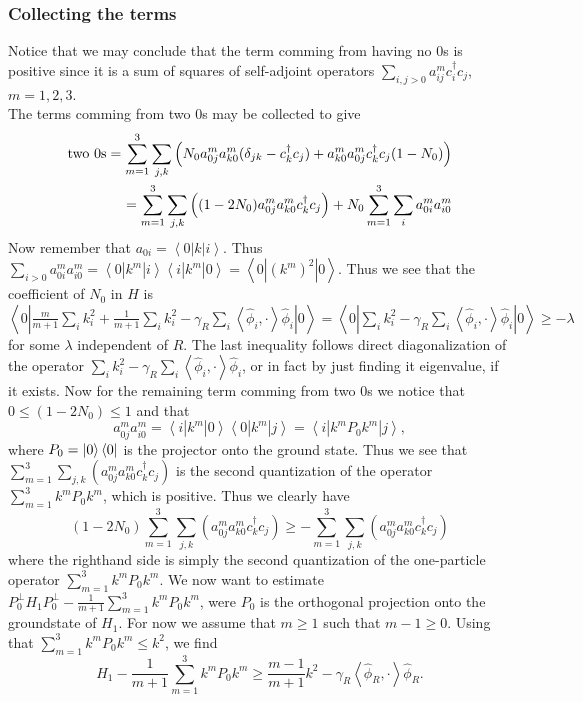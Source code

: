 \documentclass[a4paper,11pt]{article}
\renewcommand{\braket}[1]{\left\langle#1\right\rangle}
\numberwithin{equation}{section}
\begin{document}
\subsubsection*{Collecting the terms}
Notice that we may conclude that the term comming from having no $ 0 $s is positive since it is a sum of squares of self-adjoint operators $ \sum_{i,j>0}a^m_{ij}c_i^\dagger c_j $, $ m=1,2,3 $.\\
The terms comming from two $ 0 $s may be collected to give
\begin{equation}
\begin{aligned}
\text{two $ 0 $s}=\sum_{m=1}^{3}\sum_{j,k}\left(N_0a^m_{0j}a^m_{k0}(\delta_{jk}-c^\dagger_kc_j)+a^m_{k0}a^m_{0j}c_k^\dagger c_j(1-N_0)\right)\\
=\sum_{m=1}^{3}\sum_{j,k}\left((1-2N_0)a^m_{0j}a^m_{k0}c^\dagger_kc_j\right)+N_0\sum_{m=1}^{3}\sum_{i}a_{0i}^ma_{i0}^m
\end{aligned}
\end{equation}
Now remember that $ a_{0i}=\braket{0|k|i} $. Thus $ \sum_{i>0} a^m_{0i}a^m_{i0}=\braket{0|k^m|i}\braket{i|k^m|0}=\braket{0|(k^m)^2|0} $. Thus we see that the coefficient of $ N_0 $ in $ H $ is $ \braket{0|\frac{m}{m+1}\sum_{i}k_i^2+\frac{1}{m+1}\sum_{i}k_i^2-\gamma_R\sum_{i}\braket{\hat{\phi}_i,\cdot}\hat{\phi}_i|0}=\braket{0|\sum_{i}k_i^2-\gamma_R\sum_{i}\braket{\hat{\phi}_i,\cdot}\hat{\phi}_i|0}\geq -\lambda $ for some $ \lambda $ independent of $ R $. The last inequality follows direct diagonalization of the operator $ \sum_{i}k_i^2-\gamma_R\sum_{i}\braket{\hat{\phi}_i,\cdot}\hat{\phi}_i $, or in fact by just finding it eigenvalue, if it exists. Now for the remaining term comming from two $ 0 $s we notice that $ 0\leq(1-2N_0)\leq 1 $ and that \begin{equation}
a_{0j}^ma_{i0}^m=\braket{i|k^m|0}\braket{0|k^m|j}=\braket{i|k^m P_0 k^m|j},
\end{equation}
where $ P_0=\ket{0}\bra{0} $ is the projector onto the ground state. Thus we see that $ \sum_{m=1}^{3}\sum_{j,k}\left(a^m_{0j}a^m_{k0}c^\dagger_kc_j\right) $ is the second quantization of the operator $ \sum_{m=1}^{3}k^mP_0k^m $, which is positive. Thus we clearly have \begin{equation}
(1-2N_0)\sum_{m=1}^{3}\sum_{j,k}\left(a^m_{0j}a^m_{k0}c^\dagger_kc_j\right)\geq-\sum_{m=1}^{3}\sum_{j,k}\left(a^m_{0j}a^m_{k0}c^\dagger_kc_j\right)  %
\end{equation}
where the righthand side is simply the second quantization of the one-particle operator $ \sum_{m=1}^{3}k^mP_0k^m $. We now want to estimate $ P_0^\perp H_1 P_0^\perp-\frac{1}{m+1}\sum_{m=1}^{3}k^mP_0k^m  $, were $ P_0 $ is the orthogonal projection onto the groundstate of $ H_1 $. For now we assume that $ m\geq 1 $ such that $ m-1\geq 0 $. Using that $ \sum_{m=1}^{3}k^mP_0k^m\leq k^2 $, we find \begin{equation}
H_1-\frac{1}{m+1}\sum_{m=1}^{3}k^mP_0k^m\geq \frac{m-1}{m+1}k^2-\gamma_R\braket{\hat{\phi}_R,\cdot}\hat{\phi}_R.
\end{equation}
\end{document}
